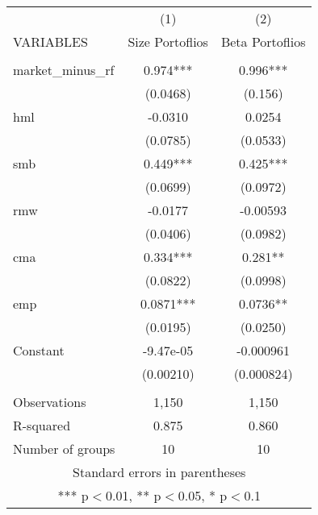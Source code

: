 \begin{tabular}{lcc} \hline
 & (1) & (2) \\
VARIABLES & Size Portoflios & Beta Portoflios \\ \hline
 &  &  \\
market\_minus\_rf & 0.974*** & 0.996*** \\
 & (0.0468) & (0.156) \\
hml & -0.0310 & 0.0254 \\
 & (0.0785) & (0.0533) \\
smb & 0.449*** & 0.425*** \\
 & (0.0699) & (0.0972) \\
rmw & -0.0177 & -0.00593 \\
 & (0.0406) & (0.0982) \\
cma & 0.334*** & 0.281** \\
 & (0.0822) & (0.0998) \\
emp & 0.0871*** & 0.0736** \\
 & (0.0195) & (0.0250) \\
Constant & -9.47e-05 & -0.000961 \\
 & (0.00210) & (0.000824) \\
 &  &  \\
Observations & 1,150 & 1,150 \\
R-squared & 0.875 & 0.860 \\
 Number of groups & 10 & 10 \\ \hline
\multicolumn{3}{c}{ Standard errors in parentheses} \\
\multicolumn{3}{c}{ *** p$<$0.01, ** p$<$0.05, * p$<$0.1} \\
\end{tabular}
